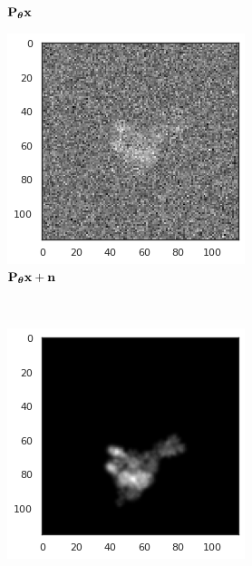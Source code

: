 \begin{figure}[ht!]
\begin{minipage}[b]{0.35\linewidth}
\begin{subfigure}[b]{0.49\textwidth}
            \caption*{$\mathbf{P}_{{\boldsymbol{\theta}}} \mathbf{x}$}
        \end{subfigure}
        \hfill
        \begin{subfigure}[b]{0.49\linewidth}
            \centering
            \includegraphics[width=0.8\linewidth]{figures/5j0n_noise16}
            \caption*{$\mathbf{P}_{{\boldsymbol{\theta}}} \mathbf{x} + \mathbf{n}$}
        \end{subfigure}
        \\ \vspace{1em}
        \begin{subfigure}[b]{0.49\linewidth}
            \centering
            \includegraphics[width=0.8\linewidth]{figures/5j0n_translated}

\end{subfigure}
\end{minipage}
\end{figure}
